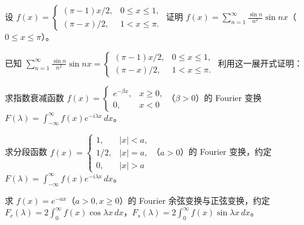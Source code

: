 \noindent\begin{minipage}{\textwidth}
设 $f(x)=\begin{cases}(\pi-1)x/2,&0\le x\le1,\\(\pi-x)/2,&1<x\le\pi.\end{cases}$ 证明 $\displaystyle f(x)=\sum_{n=1}^{\infty}\frac{\sin n}{n^2}\sin nx$（$0\le x\le\pi$）。
\end{minipage}\par\vfill
\noindent\begin{minipage}{\textwidth}
已知 $\displaystyle\sum_{n=1}^{\infty}\frac{\sin n}{n^2}\sin nx=\begin{cases}(\pi-1)x/2,&0\le x\le1,\\(\pi-x)/2,&1<x\le\pi.\end{cases}$ 利用这一展开式证明：
\end{minipage}\par\vfill
\noindent\begin{minipage}{\textwidth}
求指数衰减函数 $f(x)=\begin{cases}e^{-\beta x},&x\ge0,\\0,&x<0\end{cases}$（$\beta>0$）的 Fourier 变换 $F(\lambda)=\int_{-\infty}^{\infty}f(x)e^{-i\lambda x}\,dx$。
\end{minipage}\par\vfill
\newpage
\noindent\begin{minipage}{\textwidth}
求分段函数 $f(x)=\begin{cases}1,&|x|<a,\\1/2,&|x|=a,\\0,&|x|>a\end{cases}$（$a>0$）的 Fourier 变换，约定 $F(\lambda)=\int_{-\infty}^{\infty}f(x)e^{-i\lambda x}\,dx$。
\end{minipage}\par\vfill
\noindent\begin{minipage}{\textwidth}
求 $f(x)=e^{-ax}$（$a>0,x\ge0$）的 Fourier 余弦变换与正弦变换，约定 $F_c(\lambda)=2\int_0^{\infty}f(x)\cos\lambda x\,dx$，$F_s(\lambda)=2\int_0^{\infty}f(x)\sin\lambda x\,dx$。
\end{minipage}\par\vfill
